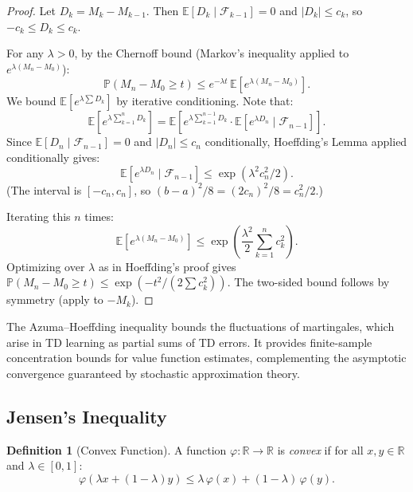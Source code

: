 \documentclass[11pt,a4paper]{article}
\theoremstyle{definition}
\newtheorem{definition}{Definition}[section]
\theoremstyle{plain}
\theoremstyle{remark}
\newcommand{\E}{\mathbb{E}}
\newcommand{\R}{\mathbb{R}}
\newcommand{\Prob}{\mathbb{P}}
\begin{document}
\begin{proof}
Let $D_k = M_k - M_{k-1}$. Then $\E[D_k \mid \mathcal{F}_{k-1}] = 0$ and $|D_k| \leq c_k$, so $-c_k \leq D_k \leq c_k$.

For any $\lambda > 0$, by the Chernoff bound (Markov's inequality applied to $e^{\lambda(M_n - M_0)}$):
\begin{equation}
    \Prob(M_n - M_0 \geq t) \leq e^{-\lambda t}\, \E[e^{\lambda(M_n - M_0)}].
\end{equation}
We bound $\E[e^{\lambda \sum D_k}]$ by iterative conditioning. Note that:
\begin{equation}
    \E[e^{\lambda \sum_{k=1}^n D_k}] = \E\!\left[e^{\lambda \sum_{k=1}^{n-1} D_k} \cdot \E[e^{\lambda D_n} \mid \mathcal{F}_{n-1}]\right].
\end{equation}
Since $\E[D_n \mid \mathcal{F}_{n-1}] = 0$ and $|D_n| \leq c_n$ conditionally, Hoeffding's Lemma applied conditionally gives:
\begin{equation}
    \E[e^{\lambda D_n} \mid \mathcal{F}_{n-1}] \leq \exp(\lambda^2 c_n^2 / 2).
\end{equation}
(The interval is $[-c_n, c_n]$, so $(b-a)^2/8 = (2c_n)^2/8 = c_n^2/2$.)

Iterating this $n$ times:
\begin{equation}
    \E[e^{\lambda(M_n - M_0)}] \leq \exp\!\left(\frac{\lambda^2}{2}\sum_{k=1}^n c_k^2\right).
\end{equation}
Optimizing over $\lambda$ as in Hoeffding's proof gives $\Prob(M_n - M_0 \geq t) \leq \exp(-t^2 / (2\sum c_k^2))$. The two-sided bound follows by symmetry (apply to $-M_k$).
\end{proof}

\begin{rlconnection}[Connection to RL]
The Azuma--Hoeffding inequality bounds the fluctuations of martingales, which arise in TD learning as partial sums of TD errors. It provides finite-sample concentration bounds for value function estimates, complementing the asymptotic convergence guaranteed by stochastic approximation theory.
\end{rlconnection}

\subsection{Jensen's Inequality}
\label{subsec:jensen}

\begin{definition}[Convex Function]
\label{def:convex}
A function $\varphi: \R \to \R$ is \emph{convex} if for all $x, y \in \R$ and $\lambda \in [0,1]$:
\begin{equation}
    \varphi(\lambda x + (1-\lambda) y) \leq \lambda\, \varphi(x) + (1-\lambda)\, \varphi(y).
    \label{eq:convex_def}
\end{equation}
\end{definition}
\end{document}

